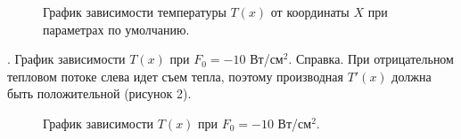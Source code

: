\documentclass[a4paper,14pt]{article}
\begin{document}
\begin{figure}[!h]
\caption{График зависимости температуры $T(x)$ от координаты $X$ при параметрах по умолчанию.}
\label{fig:image}
\end{figure}

. График зависимости $T(x)$ при $F_0 = -10$ Вт/см$^2$.
Справка. При отрицательном тепловом потоке слева идет съем тепла, поэтому производная
$T'(x)$ должна быть положительной (рисунок 2).

\begin{figure}[!h]
	\caption{График зависимости $T(x)$ при $F_0 = -10$ Вт/см$^2$.}
	\label{fig:image}
\end{figure}
\end{document}
